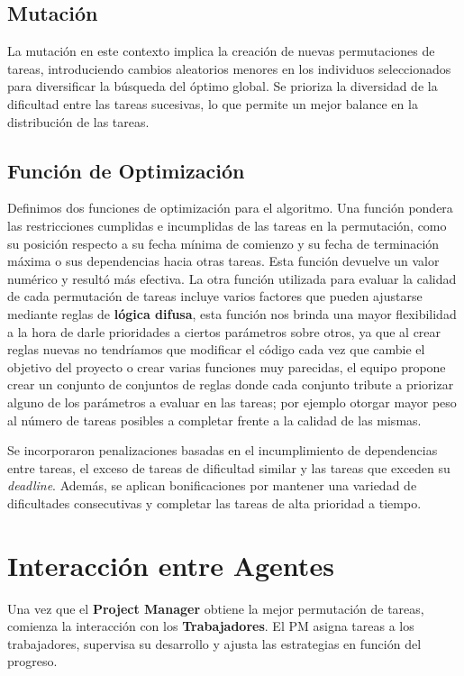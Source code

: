 \documentclass[a4paper, 12pt]{article}
\begin{document}
\subsection{Mutación}
La mutación en este contexto implica la creación de nuevas permutaciones de tareas, introduciendo cambios aleatorios menores en los individuos seleccionados para diversificar la búsqueda del óptimo global. Se prioriza la diversidad de la dificultad entre las tareas sucesivas, lo que permite un mejor balance en la distribución de las tareas.

\subsection{Función de Optimización}
Definimos dos funciones de optimización para el algoritmo. Una función pondera las restricciones cumplidas e incumplidas de las tareas en la permutación, como su posición respecto a su fecha mínima de comienzo y su fecha de terminación máxima o sus dependencias hacia otras tareas. Esta función devuelve un valor numérico y resultó más efectiva.
La otra función utilizada para evaluar la calidad de cada permutación de tareas incluye varios factores que pueden ajustarse mediante reglas de \textbf{lógica difusa}, esta función nos brinda una mayor flexibilidad a la hora de darle prioridades a ciertos parámetros sobre otros, ya que al crear reglas nuevas no tendríamos que modificar el código cada vez que cambie el objetivo del proyecto o crear varias funciones muy parecidas, el equipo propone crear un conjunto de conjuntos de reglas donde cada conjunto tribute a priorizar alguno de los parámetros a evaluar en las tareas; por ejemplo otorgar mayor peso al número de tareas posibles a completar frente a la calidad de las mismas.

Se incorporaron penalizaciones basadas en el incumplimiento de dependencias entre tareas, el exceso de tareas de dificultad similar y las tareas que exceden su \textit{deadline}. Además, se aplican bonificaciones por mantener una variedad de dificultades consecutivas y completar las tareas de alta prioridad a tiempo.

\section{Interacción entre Agentes}
Una vez que el \textbf{Project Manager} obtiene la mejor permutación de tareas, comienza la interacción con los \textbf{Trabajadores}. El PM asigna tareas a los trabajadores, supervisa su desarrollo y ajusta las estrategias en función del progreso.
\end{document}
